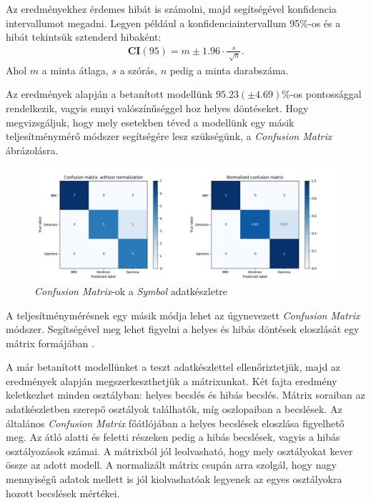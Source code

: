 Az eredményekhez érdemes hibát is számolni, majd segítségével konfidencia intervallumot megadni. Legyen például a konfidenciaintervallum 95\%-os és a hibát tekintsük sztenderd hibaként:
\begin{align*}
	\boldsymbol{CI}(95) = m \pm 1.96 \cdot \frac{s}{\sqrt[]{n}}.
\end{align*}
Ahol $m$ a minta átlaga, $s$ a szórás, $n$ pedig a minta darabszáma.

Az eredmények alapján a betanított modellünk $95.23 (\pm 4.69)$\%-os pontossággal rendelkezik, vagyis ennyi valószínűséggel hoz helyes döntéseket. Hogy megvizsgáljuk, hogy mely esetekben téved a modellünk egy másik teljesítménymérő módszer segítségére lesz szükségünk, a \textit{Confusion Matrix} ábrázolásra.


\begin{figure}[h]
\centering
\includegraphics[width=\textwidth]{images/symbol_confusion.png}
\caption{\textit{Confusion Matrix}-ok a \textit{Symbol} adatkészletre}
\label{fig:confusionm}
\end{figure}

A teljesítménymérésnek egy másik módja lehet az úgynevezett \textit{Confusion Matrix} módszer. Segítségével meg lehet figyelni a helyes és hibás döntések eloszlását egy mátrix formájában \cite{koesmarno2019class}.

A már betanított modellünket a teszt adatkészlettel ellenőriztetjük, majd az eredmények alapján megszerkeszthetjük a mátrixunkat. Két fajta eredmény keletkezhet minden osztályban: helyes becslés és hibás becslés. Mátrix soraiban az adatkészletben szerepő osztályok találhatók, míg oszlopaiban a becslések. Az általános \textit{Confusion Matrix} főátlójában a helyes becslések eloszlása figyelhető meg. Az átló alatti és feletti részeken pedig a hibás becslések, vagyis a hibás osztályozások számai. A mátrixból jól leolvasható, hogy mely osztályokat kever össze az adott modell. A normalizált mátrix csupán arra szolgál, hogy nagy mennyiségű adatok mellett is jól kiolvashatóak legyenek az egyes osztályokra hozott becslések mértékei.

